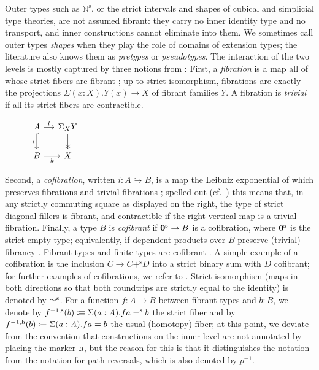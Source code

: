 Outer types such as
$\mathbb{N}^{\mathrm{s}}$, or the strict intervals and shapes of cubical
and simplicial type theories, are not assumed fibrant: they carry no
inner identity type and no transport, and inner constructions cannot
eliminate into them. We sometimes call outer types \emph{shapes} when they play the role
of domains of extension types; the literature also knows them as \emph{pretypes} or \emph{pseudotypes}.
The interaction of the two levels is mostly captured by 
three notions from \citet[\S3]{2LTT}:
First, a \emph{fibration} is a map all of whose strict fibers are fibrant
\citep[Def.~3.7, Lem.~3.9]{2LTT}; up to strict isomorphism, fibrations are exactly the projections $\Sigma(x:X).Y(x) \to X$ of fibrant families $Y$.
A fibration is \emph{trivial} if all its strict fibers are contractible.
\begin{figure}
	\centering
	\vspace{-1.0\baselineskip}
	$\begin{tikzcd}[column sep=small, row sep=normal]
		A  \ar[r,"l"] \ar[d,hookrightarrow,"i"']
		& \Sigma_X Y \ar[d,->>] \\
		B \ar[r, "k"'] & X
	\end{tikzcd}$
	\vspace{-1.1\baselineskip}
\end{figure}
Second, a \emph{cofibration}, written $i : A \hookrightarrow B$, is a map the Leibniz exponential of which preserves fibrations and trivial fibrations
\citep[Def.~3.13]{2LTT}; spelled out (cf.~\citealp[Rem.~3.14(i)]{2LTT}) this means that, in any strictly commuting square as displayed on the right,
the type of strict diagonal fillers is fibrant, and contractible if the right vertical map is a trivial fibration.
Finally, a type $B$ is \emph{cofibrant} if
$\mathbf{0}^\textup{s} \to B$ is a cofibration, where $\mathbf{0}^\textup{s}$ is the strict
empty type; equivalently, if dependent products
over $B$ preserve (trivial) fibrancy \citep[Cor.~3.20]{2LTT}. Fibrant types
and finite types are cofibrant \citep[Lem.~3.25]{2LTT}.
A simple example of a cofibration is the inclusion $C \to C +^{\mathrm{s}} D$ into a strict binary sum with $D$ cofibrant;
for further examples of cofibrations, we refer to \citet[\S~3.4]{2LTT}. Strict isomorphism (maps in both directions so that both roundtrips are strictly equal to the identity) is denoted by $\mathrel{\simeq^\textup{s}}$.
For a function $f : A \to B$ between fibrant types and $b : B$, we denote by ${f}^{-1, \textup{s}} (b) \mathrel{\vcentcolon\mspace{-1mu}\equiv} \Sigma (a:A). fa \mathrel{=^\textup{s}} b$ the strict fiber and by ${f}^{-1, \textup{h}} (b) \mathrel{\vcentcolon\mspace{-1mu}\equiv} \Sigma (a:A). fa = b$ the usual (homotopy) fiber; at this point, we deviate from the convention that constructions on the inner level are not annotated by placing the marker $\textup{h}$, but the reason for this is that it distinguishes the notation from the notation for path reversals, which is also denoted by $p^{-1}$.


